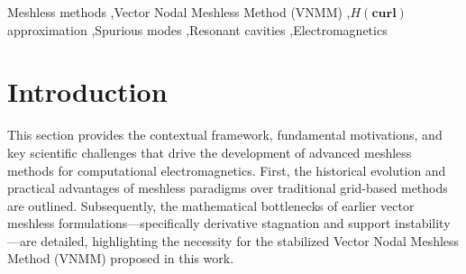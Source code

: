 \documentclass[preprint,12pt]{elsarticle}
\begin{document}
\begin{frontmatter}


    \begin{keyword}
        Meshless methods \sep Vector Nodal Meshless Method (VNMM) \sep $H(\mathbf{curl})$ approximation \sep Spurious modes \sep Resonant cavities \sep Electromagnetics


    \end{keyword}

\end{frontmatter}

\linenumbers

\section{Introduction}
\label{sec:intro}

This section provides the contextual framework, fundamental motivations, and key scientific challenges that drive the development of advanced meshless methods for computational electromagnetics. First, the historical evolution and practical advantages of meshless paradigms over traditional grid-based methods are outlined. Subsequently, the mathematical bottlenecks of earlier vector meshless formulations---specifically derivative stagnation and support instability---are detailed, highlighting the necessity for the stabilized Vector Nodal Meshless Method (VNMM) proposed in this work.
\end{document}
